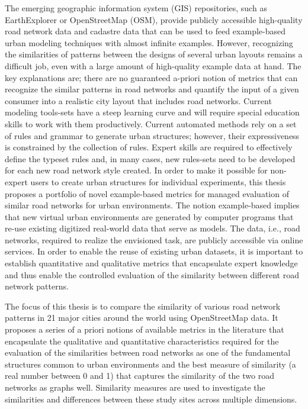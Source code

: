 
The emerging geographic information system (GIS) repositories, such as EarthExplorer or OpenStreetMap (OSM), provide publicly accessible high-quality road network data and cadastre data that can be used to feed example-based urban modeling techniques with almost infinite examples. However, recognizing the similarities of patterns between the designs of several urban layouts remains a difficult job, even with a large amount of high-quality example data at hand. The key explanations are;  there are no guaranteed a-priori notion of metrics that can recognize the similar patterns in road networks and quantify the input of a given consumer into a realistic city layout that includes road networks.  Current modeling tools-sets have a steep learning curve and will require special education skills to work with them productively. Current automated methods rely on a set of rules and grammar to generate urban structures; however, their expressiveness is constrained by the collection of rules. Expert skills are required to effectively define the typeset rules and, in many cases, new rules-sets need to be developed for each new road network style created. In order to make it possible for non-expert users to create urban structures for individual experiments, this thesis proposes a portfolio of novel example-based metrics for managed evaluation of similar road networks for urban environments. The notion example-based implies that new virtual urban environments are generated by computer programs that re-use existing digitized real-world data that serve as models. The data, i.e., road networks, required to realize the envisioned task, are publicly accessible via online services. In order to enable the reuse of existing urban datasets, it is important to establish quantitative and qualitative metrics that encapsulate expert knowledge and thus enable the controlled evaluation of the similarity between different road network patterns.  

The focus of this thesis is to compare the similarity of various road network patterns in 21 major cities around the world using OpenStreetMap data. It proposes a series of a priori notions of available metrics in the literature that encapsulate the qualitative and quantitative characteristics required for the evaluation of the similarities between road networks as one of the fundamental structures common to urban environments and the best measure of similarity (a real number between 0 and 1) that captures the similarity of the two road networks as graphs well. Similarity measures are used to investigate the similarities and differences between these study sites across multiple dimensions.

